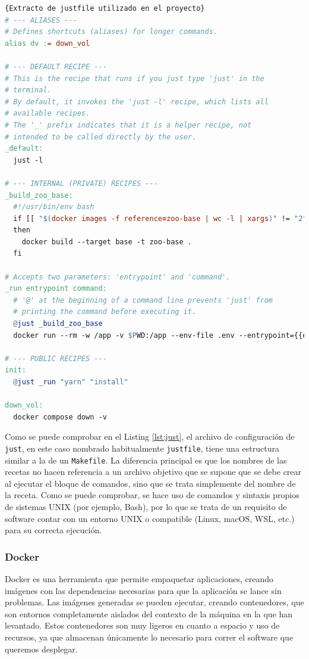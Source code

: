 \begin{lstlisting}[language=make,label=lst:just]{Extracto de justfile utilizado en el proyecto}
# --- ALIASES ---
# Defines shortcuts (aliases) for longer commands.
alias dv := down_vol

# --- DEFAULT RECIPE ---
# This is the recipe that runs if you just type 'just' in the
# terminal.
# By default, it invokes the 'just -l' recipe, which lists all
# available recipes.
# The '_' prefix indicates that it is a helper recipe, not
# intended to be called directly by the user.
_default:
  just -l

# --- INTERNAL (PRIVATE) RECIPES ---
_build_zoo_base:
  #!/usr/bin/env bash
  if [[ "$(docker images -f reference=zoo-base | wc -l | xargs)" != "2" ]]
  then
    docker build --target base -t zoo-base .
  fi

# Accepts two parameters: 'entrypoint' and 'command'.
_run entrypoint command:
  # '@' at the beginning of a command line prevents 'just' from
  # printing the command before executing it.
  @just _build_zoo_base
  docker run --rm -w /app -v $PWD:/app --env-file .env --entrypoint={{entrypoint}} zoo-base {{command}}

# --- PUBLIC RECIPES ---
init:
  @just _run "yarn" "install"

down_vol:
  docker compose down -v
\end{lstlisting}

Como se puede comprobar en el Listing \ref{lst:just}, el archivo de configuración de \texttt{just}, en este caso nombrado habitualmente \texttt{justfile}, tiene una estructura similar a la de un \texttt{Makefile}. La diferencia principal es que los nombres de las recetas no hacen referencia a un archivo objetivo que se supone que se debe crear al ejecutar el bloque de comandos, sino que se trata simplemente del nombre de la receta. Como se puede comprobar, se hace uso de comandos y sintaxis propios de sistemas UNIX (por ejemplo, Bash), por lo que se trata de un requisito de software contar con un entorno UNIX o compatible (Linux, macOS, WSL, etc.) para su correcta ejecución.

\subsubsection*{Docker}

Docker\cite{docker} es una herramienta que permite empaquetar aplicaciones, creando imágenes con las dependencias necesarias  para que la aplicación se lance sin problemas. Las imágenes generadas se pueden ejecutar, creando contenedores, que son entornos completamente aislados del contexto de la máquina en la que han levantado. Estos contenedores son muy ligeros en cuanto a espacio y uso de recursos, ya que almacenan únicamente lo necesario para correr el software que queremos desplegar.

